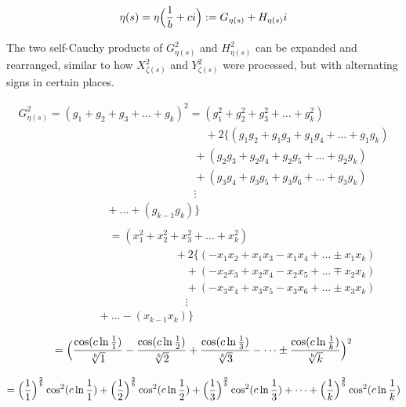 \documentclass{amsart}
\begin{document}
	\[ \eta(s) = \eta\Bigl( \frac{1}{b}+ci \Bigr) := G_{\eta(s)}+H_{\eta(s)}i \]
	
	The two self-Cauchy products of $G_{\eta(s)}^2$ and $H_{\eta(s)}^2$ can be expanded and rearranged, similar to how $X_{\zeta(s)}^2$ and $Y_{\zeta(s)}^2$ were processed, but with alternating signs in certain places.
	
	\[ \begin{array}{c}
		G_{\eta(s)}^2 = (g_1 {+} g_2 {+} g_3 {+} \dots {+} g_k)^2 = (g_1^2 {+} g_2^2 {+} g_3^2 {+} \dots {+} g_k^2) \\
		\qquad\qquad\qquad\qquad\qquad\qquad\qquad\qquad\quad {+} 2\{(g_1g_2 {+} g_1g_3 {+} g_1g_4 {+} \dots {+} g_{1}g_{k}) \\ 
		\qquad\qquad\qquad\qquad\qquad\qquad\qquad\qquad {+} (g_2g_3 {+} g_2g_4 {+} g_2g_5 {+} \dots {+} g_2g_{k}) \\ 
		\qquad\qquad\qquad\qquad\qquad\qquad\qquad\qquad {+} (g_3g_4 {+} g_3g_5 {+} g_3g_6 {+} \dots {+} g_3g_{k}) \\ 
		\qquad\qquad\qquad\qquad\qquad\qquad\qquad\qquad \vdots \\
		\qquad\qquad\qquad\qquad {+} \dots {+} (g_{k-1}g_{k}) \} \\ 
	\end{array} \]
	\[ \begin{array}{c}
		\qquad\qquad\qquad\quad = (x_1^2 {+} x_2^2 {+} x_3^2 {+} \dots {+} x_k^2) \\ 
		\qquad\qquad\qquad\qquad\qquad\qquad\quad {+} 2\{(-x_1x_2 {+} x_1x_3 - x_1x_4 {+} \dots \pm x_{1}x_{k}) \\ 
		\qquad\qquad\qquad\qquad\qquad\qquad\qquad {+} (-x_2x_3 {+} x_2x_4 - x_2x_5 {+} \dots \mp x_{2}x_{k}) \\ 
		\qquad\qquad\qquad\qquad\qquad\qquad\qquad {+} (-x_3x_4 {+} x_3x_5 - x_3x_6 {+} \dots \pm x_{3}x_{k}) \\ 
		\qquad\qquad\qquad\qquad\qquad\qquad\qquad \vdots \\
		\qquad\qquad\qquad {+} \dots - (x_{k-1}x_{k}) \} \\ 
	\end{array} \]
	\[\]
	\[\]
	\[ = \Bigl( \frac{\cos({c\ln \frac{1}{1}})}{\sqrt[b]{1}} - \frac{\cos({c\ln \frac{1}{2}})}{\sqrt[b]{2}} + \frac{\cos({c\ln \frac{1}{3}})}{\sqrt[b]{3}} - \dots \pm \frac{\cos({c\ln \frac{1}{k}})}{\sqrt[b]{k}} \Bigr)^2 \]
	\[\]
	\[\]
	\[ = \Bigl( \frac{1}{1} \Bigr)^{\frac2b}\cos^2({c \ln \frac{1}{1}}) + \Bigl( \frac{1}{2} \Bigr)^{\frac2b}\cos^2({c \ln \frac{1}{2}}) + \Bigl( \frac{1}{3} \Bigr)^{\frac2b}\cos^2({c \ln \frac{1}{3}}) + \dots + \Bigl( \frac{1}{k} \Bigr)^{\frac2b}\cos^2({c \ln \frac{1}{k}}) \]
\end{document}
